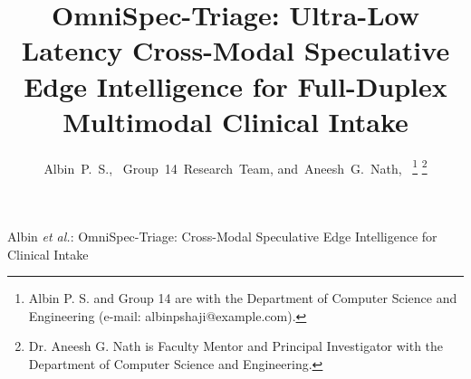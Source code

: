 \documentclass[10pt,journal,compsoc]{IEEEtran}
\begin{document}
\title{OmniSpec-Triage: Ultra-Low Latency Cross-Modal Speculative Edge Intelligence for Full-Duplex Multimodal Clinical Intake}

\author{Albin~P.~S.,~
        Group~14~Research~Team,
        and~Aneesh~G.~Nath,~%
\thanks{Albin P. S. and Group 14 are with the Department of Computer Science and Engineering (e-mail: albinpshaji@example.com).}%
\thanks{Dr. Aneesh G. Nath is Faculty Mentor and Principal Investigator with the Department of Computer Science and Engineering.}%
}

%
{Albin \MakeLowercase{\textit{et al.}}: OmniSpec-Triage: Cross-Modal Speculative Edge Intelligence for Clinical Intake}
\end{document}
